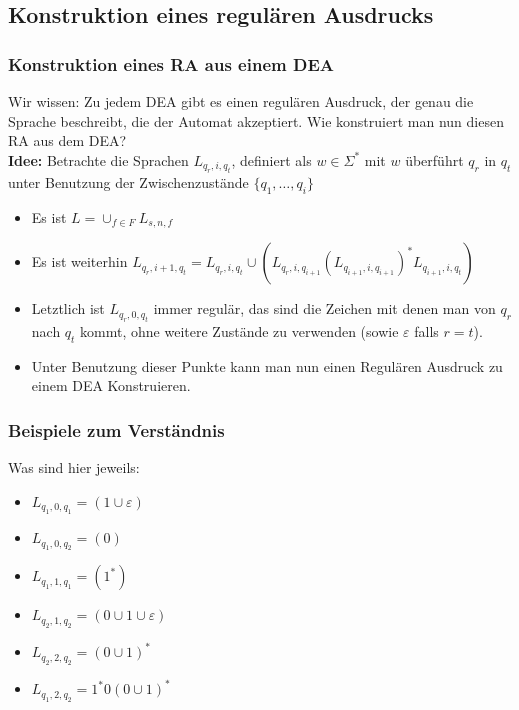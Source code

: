 \documentclass{beamer}
\begin{document}
{\subsection{Konstruktion eines regulären Ausdrucks}
\begin{frame}
\frametitle{Konstruktion eines RA aus einem DEA}
Wir wissen: Zu jedem DEA gibt es einen regulären Ausdruck, der genau die Sprache beschreibt, die der Automat akzeptiert. Wie konstruiert man nun diesen RA aus dem DEA?\\[0.6cm]
\textbf{Idee:} Betrachte die Sprachen $L_{q_r,i,q_t}$, definiert als \( w \in \Sigma^*\) mit $w$ überführt $q_r$ in $q_t$ unter Benutzung der Zwischenzustände $\{q_1,\ldots,q_i\}$
\begin{itemize}
\item Es ist $L = \cup_{f\in F} L_{s,n,f}$
\item Es ist weiterhin $L_{q_r,i+1,q_t} = L_{q_r,i,q_t} \cup (L_{q_r,i,q_{i+1}}(L_{q_{i+1},i,q_{i+1}})^*L_{q_{i+1},i,q_t})$
\item Letztlich ist $L_{q_r, 0, q_t}$ immer regulär, das sind die Zeichen mit denen man von $q_r$ nach $q_t$ kommt, ohne weitere Zustände zu verwenden (sowie $\varepsilon$ falls $r = t$).
\item Unter Benutzung dieser Punkte kann man nun einen Regulären Ausdruck zu einem DEA Konstruieren.
\end{itemize}
\end{frame}
\begin{frame}
\frametitle{Beispiele zum Verständnis}
\vspace{-1cm}
\begin{figure}[H]
\begin{center}
\end{center}
\end{figure}
Was sind hier jeweils:
\begin{itemize}
\item $L_{q_1,0,q_1}$\pause $ = (1\cup\varepsilon)$
\item $L_{q_1,0,q_2}$\pause $ = (0)$
\item $L_{q_1,1,q_1}$\pause $ = (1^*)$
\item $L_{q_2,1,q_2}$\pause $ = (0\cup1\cup\varepsilon)$
\item $L_{q_2,2,q_2}$\pause $ = (0\cup1)^*$
\item $L_{q_1,2,q_2}$\pause $ = 1^*0(0\cup1)^*$
\end{itemize}
\end{frame}

}
\end{document}
